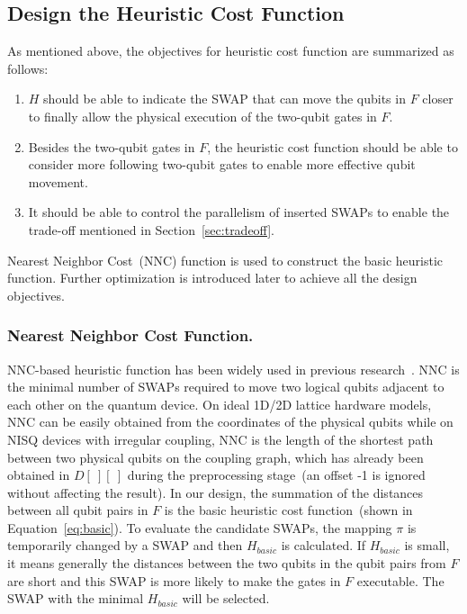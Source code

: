 \documentclass[journal,10pt,twocolumn]{IEEEtran}
\begin{document}
\subsection{Design the Heuristic Cost Function}\label{sec:heuristic}
As mentioned above, the objectives for heuristic cost function are summarized as follows:
\begin{enumerate}
\item $H$ should be able to indicate the SWAP that can move the qubits in $F$ closer to finally allow the physical execution of the two-qubit gates in $F$.
\item Besides the two-qubit gates in $F$, the heuristic cost function should be able to consider more following two-qubit gates to enable more effective qubit movement.
\item It should be able to control the parallelism of inserted SWAPs to enable the trade-off mentioned in Section~\ref{sec:tradeoff}.
\end{enumerate}

Nearest Neighbor Cost~(NNC) function is used to construct the basic heuristic function. Further optimization is introduced later to achieve all the design objectives.

\subsubsection{Nearest Neighbor Cost Function.}
NNC-based heuristic function has been widely used in previous research~\cite{wille2016look,zulehner2018efficient,saeedi2011synthesis}. 
NNC is the minimal number of SWAPs required to move two logical qubits adjacent to each other on the quantum device. 
On ideal 1D/2D lattice hardware models, NNC can be easily obtained from the coordinates of the physical qubits while on NISQ devices with irregular coupling, NNC is the length of the shortest path between two physical qubits on the coupling graph, which 
has already been obtained in $D[~][~]$ during the preprocessing stage~(an offset -1 is ignored without affecting the result).
In our design, the summation of the distances between all qubit pairs in $F$ is the basic heuristic cost function~(shown in Equation~\ref{eq:basic}). %
To evaluate the candidate SWAPs, the mapping $\pi$ is temporarily changed by a SWAP and then $H_{basic}$ is calculated.
If $H_{basic}$ is small, it means generally the distances between the two qubits in the qubit pairs from $F$ are short and this SWAP is more likely to make the gates in $F$ executable.
The SWAP with the minimal $H_{basic}$ will be selected. 
\end{document}
